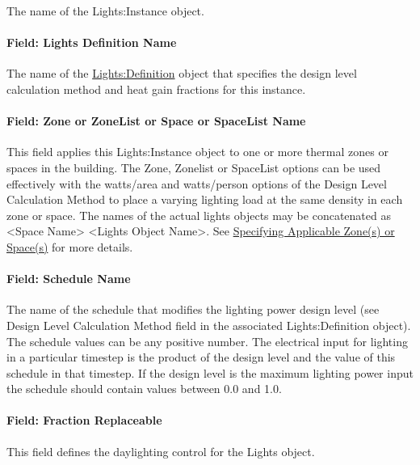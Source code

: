 The name of the Lights:Instance object.

\paragraph{Field: Lights Definition Name}\label{field-lights-definition-name}

The name of the \hyperref[lightsdefinition]{Lights:Definition} object that specifies the design level calculation method and heat gain fractions for this instance.

\paragraph{Field: Zone or ZoneList or Space or SpaceList Name}\label{lights-field-zone-or-zonelist-name-000-lights-instance}

This field applies this Lights:Instance object to one or more thermal zones or spaces in the building. The Zone, Zonelist or SpaceList options can be used effectively with the watts/area and watts/person options of the Design Level Calculation Method to place a varying lighting load at the same density in each zone or space. The names of the actual lights objects may be concatenated as \textless{}Space Name\textgreater{} \textless{}Lights Object Name\textgreater{}. See \hyperref[specifying-applicable-zones-or-spaces]{Specifying Applicable Zone(s) or Space(s)} for more details.

\paragraph{Field: Schedule Name}\label{field-schedule-name-002-lights-instance}

The name of the schedule that modifies the lighting power design level (see Design Level Calculation Method field in the associated Lights:Definition object). The schedule values can be any positive number. The electrical input for lighting in a particular timestep is the product of the design level and the value of this schedule in that timestep. If the design level is the maximum lighting power input the schedule should contain values between 0.0 and 1.0.

\paragraph{Field: Fraction Replaceable}\label{field-fraction-replaceable-lights-instance}

This field defines the daylighting control for the Lights object.

